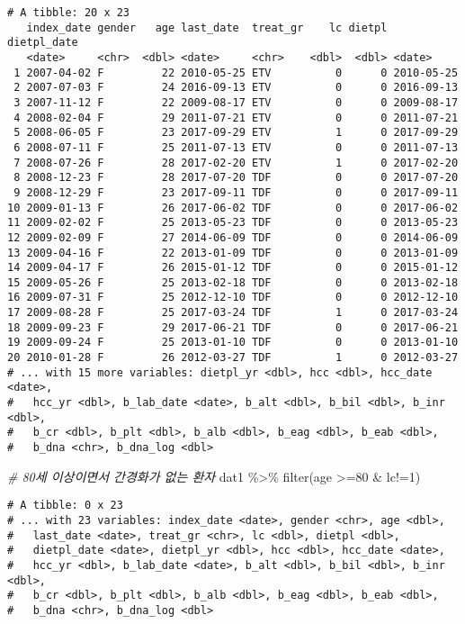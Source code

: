 \documentclass[
]{article}
\newenvironment{Shaded}{\begin{snugshade}}{\end{snugshade}}
\newcommand{\CommentTok}[1]{\textcolor[rgb]{0.56,0.35,0.01}{\textit{#1}}}
\newcommand{\DecValTok}[1]{\textcolor[rgb]{0.00,0.00,0.81}{#1}}
\newcommand{\FunctionTok}[1]{\textcolor[rgb]{0.00,0.00,0.00}{#1}}
\newcommand{\NormalTok}[1]{#1}
\newcommand{\SpecialCharTok}[1]{\textcolor[rgb]{0.00,0.00,0.00}{#1}}
\begin{document}
\begin{verbatim}
# A tibble: 20 x 23
   index_date gender   age last_date  treat_gr    lc dietpl dietpl_date
   <date>     <chr>  <dbl> <date>     <chr>    <dbl>  <dbl> <date>     
 1 2007-04-02 F         22 2010-05-25 ETV          0      0 2010-05-25 
 2 2007-07-03 F         24 2016-09-13 ETV          0      0 2016-09-13 
 3 2007-11-12 F         22 2009-08-17 ETV          0      0 2009-08-17 
 4 2008-02-04 F         29 2011-07-21 ETV          0      0 2011-07-21 
 5 2008-06-05 F         23 2017-09-29 ETV          1      0 2017-09-29 
 6 2008-07-11 F         25 2011-07-13 ETV          0      0 2011-07-13 
 7 2008-07-26 F         28 2017-02-20 ETV          1      0 2017-02-20 
 8 2008-12-23 F         28 2017-07-20 TDF          0      0 2017-07-20 
 9 2008-12-29 F         23 2017-09-11 TDF          0      0 2017-09-11 
10 2009-01-13 F         26 2017-06-02 TDF          0      0 2017-06-02 
11 2009-02-02 F         25 2013-05-23 TDF          0      0 2013-05-23 
12 2009-02-09 F         27 2014-06-09 TDF          0      0 2014-06-09 
13 2009-04-16 F         22 2013-01-09 TDF          0      0 2013-01-09 
14 2009-04-17 F         26 2015-01-12 TDF          0      0 2015-01-12 
15 2009-05-26 F         25 2013-02-18 TDF          0      0 2013-02-18 
16 2009-07-31 F         25 2012-12-10 TDF          0      0 2012-12-10 
17 2009-08-28 F         25 2017-03-24 TDF          1      0 2017-03-24 
18 2009-09-23 F         29 2017-06-21 TDF          0      0 2017-06-21 
19 2009-09-24 F         25 2013-01-10 TDF          0      0 2013-01-10 
20 2010-01-28 F         26 2012-03-27 TDF          1      0 2012-03-27 
# ... with 15 more variables: dietpl_yr <dbl>, hcc <dbl>, hcc_date <date>,
#   hcc_yr <dbl>, b_lab_date <date>, b_alt <dbl>, b_bil <dbl>, b_inr <dbl>,
#   b_cr <dbl>, b_plt <dbl>, b_alb <dbl>, b_eag <dbl>, b_eab <dbl>,
#   b_dna <chr>, b_dna_log <dbl>
\end{verbatim}

\begin{Shaded}
\begin{Highlighting}[]
\CommentTok{\# 80세 이상이면서 간경화가 없는 환자}
\NormalTok{dat1 }\SpecialCharTok{\%\textgreater{}\%} 
  \FunctionTok{filter}\NormalTok{(age }\SpecialCharTok{\textgreater{}=}\DecValTok{80} \SpecialCharTok{\&}\NormalTok{ lc}\SpecialCharTok{!=}\DecValTok{1}\NormalTok{)}
\end{Highlighting}
\end{Shaded}

\begin{verbatim}
# A tibble: 0 x 23
# ... with 23 variables: index_date <date>, gender <chr>, age <dbl>,
#   last_date <date>, treat_gr <chr>, lc <dbl>, dietpl <dbl>,
#   dietpl_date <date>, dietpl_yr <dbl>, hcc <dbl>, hcc_date <date>,
#   hcc_yr <dbl>, b_lab_date <date>, b_alt <dbl>, b_bil <dbl>, b_inr <dbl>,
#   b_cr <dbl>, b_plt <dbl>, b_alb <dbl>, b_eag <dbl>, b_eab <dbl>,
#   b_dna <chr>, b_dna_log <dbl>
\end{verbatim}
\end{document}
